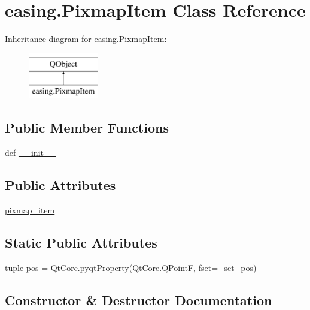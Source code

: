 \hypertarget{classeasing_1_1PixmapItem}{}\section{easing.\+Pixmap\+Item Class Reference}
\label{classeasing_1_1PixmapItem}
Inheritance diagram for easing.\+Pixmap\+Item\+:\begin{figure}[H]
\begin{center}
\leavevmode
\includegraphics[height=2.000000cm]{classeasing_1_1PixmapItem}
\end{center}
\end{figure}
\subsection*{Public Member Functions}
\begin{DoxyCompactItemize}
\item 
def \hyperlink{classeasing_1_1PixmapItem_a3e73f91a1956a06b962678ca713680e5}{\+\_\+\+\_\+init\+\_\+\+\_\+}
\end{DoxyCompactItemize}
\subsection*{Public Attributes}
\begin{DoxyCompactItemize}
\item 
\hyperlink{classeasing_1_1PixmapItem_abe9107598127adc917ee2f54975e9765}{pixmap\+\_\+item}
\end{DoxyCompactItemize}
\subsection*{Static Public Attributes}
\begin{DoxyCompactItemize}
\item 
tuple \hyperlink{classeasing_1_1PixmapItem_a30c1d810f9f9f7f6411da187f7fad0fe}{pos} = Qt\+Core.\+pyqt\+Property(Qt\+Core.\+Q\+Point\+F, fset=\+\_\+set\+\_\+pos)
\end{DoxyCompactItemize}


\subsection{Constructor \& Destructor Documentation}
\hypertarget{classeasing_1_1PixmapItem_a3e73f91a1956a06b962678ca713680e5}{}
